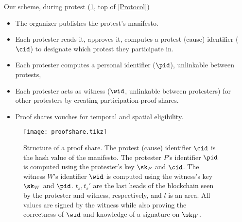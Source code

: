 \begin{columns}[t]
\begin{column}{0.32\linewidth}
    \begin{blackblock}{Our scheme, during protest (\cref{ProofShare}, top of 
        \cref{Protocol})}
      \begin{itemize}
        \item The organizer publishes the protest's manifesto.
        \item Each protester reads it, approves it, computes a protest (cause) 
          identifier (\(\cid\)) to designate which protest they participate in.
        \item Each protester computes a personal identifier (\(\pid\)), 
          unlinkable between protests,
        \item Each protester acts as witness (\(\wid\), unlinkable between 
          protesters) for other protesters by creating participation-proof 
          shares.
        \item Proof shares vouches for temporal and spatial eligibility.
      \end{itemize}
    \end{blackblock}

    \begin{figure}
      \centering
      \texttt{[image: proofshare.tikz]}
      \caption{\label{ProofShare}%
        Structure of a proof share.
        The protest (cause) identifier \(\cid\) is the hash value of the manifesto.
        The protester \(P\)'s identifier \(\pid\) is computed using the 
        protester's key \(\sk_P\) and \(\cid\).
        The witness \(W\)'s identifier \(\wid\) is computed using the witness's 
        key \(\sk_W\) and \(\pid\).
        \(t_s, t_s'\) are the last heads of the blockchain seen by the 
        protester and witness, respectively, and \(l\) is an area.
        All values are signed by the witness while also proving the correctness 
        of \(\wid\) and knowledge of a signature on \(\sk_W\).
      }%
    \end{figure}%

    \printbibliography[heading=none]

  \end{column}

  \hfill

  \begin{column}{0.32\linewidth}


\end{column}
\end{columns}
